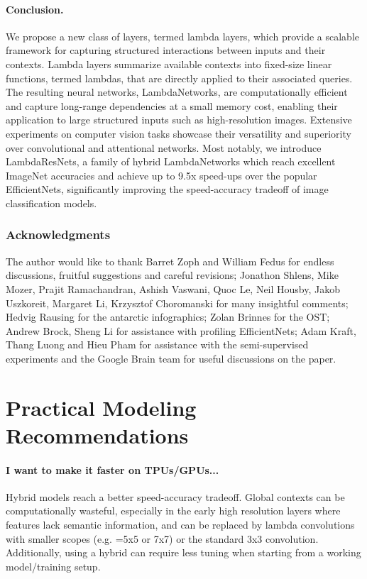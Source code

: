 \documentclass{article} \usepackage{iclr2021_conference,times}
\begin{document}
\vspace{-0.1cm}
\paragraph{Conclusion.}
We propose a new class of layers, termed lambda layers, which provide a scalable framework for capturing structured interactions between inputs and their contexts.
Lambda layers summarize available contexts into fixed-size linear functions, termed lambdas, that are directly applied to their associated queries.
The resulting neural networks, LambdaNetworks, are computationally efficient and capture long-range dependencies at a small memory cost, enabling their application to large structured inputs such as high-resolution images.
Extensive experiments on computer vision tasks showcase their versatility and superiority over convolutional and attentional networks.
Most notably, we introduce LambdaResNets, a family of hybrid LambdaNetworks which reach excellent ImageNet accuracies and achieve up to 9.5x speed-ups over the popular EfficientNets, significantly improving the speed-accuracy tradeoff of image classification models. 
\subsubsection*{Acknowledgments}
The author would like to thank Barret Zoph and William Fedus for endless discussions, fruitful suggestions and careful revisions;
Jonathon Shlens, Mike Mozer, Prajit Ramachandran, Ashish Vaswani, Quoc Le, Neil Housby, Jakob Uszkoreit, Margaret Li, Krzysztof Choromanski for many insightful comments;
Hedvig Rausing for the antarctic infographics;
Zolan Brinnes for the OST;
Andrew Brock, Sheng Li for assistance with profiling EfficientNets;
Adam Kraft, Thang Luong and Hieu Pham for assistance with the semi-supervised experiments
and the Google Brain team for useful discussions on the paper.




\newpage
\appendix
\section{Practical Modeling Recommendations\label{sec:practical recommendations}}

\paragraph{I want to make it faster on TPUs/GPUs...}
Hybrid models reach a better speed-accuracy tradeoff.
Global contexts can be computationally wasteful, especially in the early high resolution layers where features lack semantic information, and can be replaced by lambda convolutions with smaller scopes (e.g. =5x5 or 7x7) or the standard 3x3 convolution.
Additionally, using a hybrid can require less tuning when starting from a working model/training setup.
\end{document}
